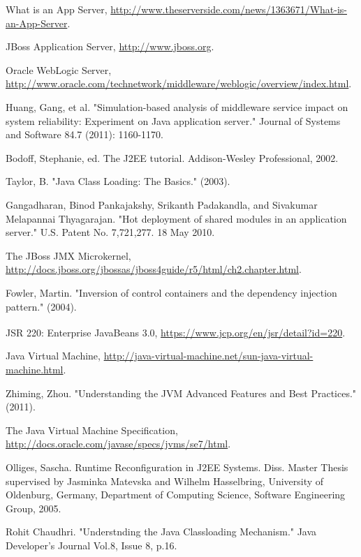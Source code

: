 \documentclass[conference]{IEEEtran}
\begin{document}
\begin{thebibliography}{9}

What is an App Server, \url{http://www.theserverside.com/news/1363671/What-is-an-App-Server}.

JBoss Application Server, \url{http://www.jboss.org}.

Oracle WebLogic Server, \url{http://www.oracle.com/technetwork/middleware/weblogic/overview/index.html}.

Huang, Gang, et al. "Simulation-based analysis of middleware service impact on system reliability: Experiment on Java application server." Journal of Systems and Software 84.7 (2011): 1160-1170.

Bodoff, Stephanie, ed. The J2EE tutorial. Addison-Wesley Professional, 2002.

Taylor, B. "Java Class Loading: The Basics." (2003).

Gangadharan, Binod Pankajakshy, Srikanth Padakandla, and Sivakumar Melapannai Thyagarajan. "Hot deployment of shared modules in an application server." U.S. Patent No. 7,721,277. 18 May 2010.

The JBoss JMX Microkernel, \url{http://docs.jboss.org/jbossas/jboss4guide/r5/html/ch2.chapter.html}.

Fowler, Martin. "Inversion of control containers and the dependency injection pattern." (2004).

JSR 220: Enterprise JavaBeans\textsuperscript{\texttrademark} 3.0, \url{https://www.jcp.org/en/jsr/detail?id=220}.

Java Virtual Machine, \url{http://java-virtual-machine.net/sun-java-virtual-machine.html}.

Zhiming, Zhou. "Understanding the JVM Advanced Features and Best Practices." (2011).

The Java Virtual Machine Specification, \url{http://docs.oracle.com/javase/specs/jvms/se7/html}.

Olliges, Sascha. Runtime Reconfiguration in J2EE Systems. Diss. Master Thesis supervised by Jasminka Matevska and Wilhelm Hasselbring, University of Oldenburg, Germany, Department of Computing Science, Software Engineering Group, 2005.

Rohit Chaudhri. "Understnding the Java Classloading Mechanism." Java Developer's Journal Vol.8, Issue 8, p.16.


\end{thebibliography}
\end{document}
